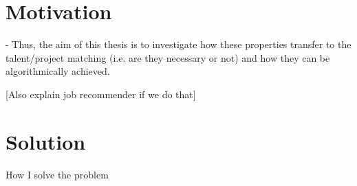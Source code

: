 \section{Motivation}\label{section:motivation}

- Thus, the aim of this thesis is to investigate how these properties transfer to the talent/project matching (i.e. are they necessary or not) and how they can be algorithmically achieved.

[Also explain job recommender if we do that]

\section{Solution}

How I solve the problem
